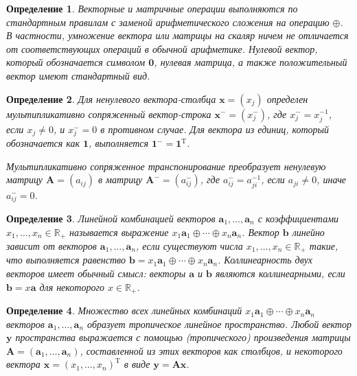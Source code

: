 \documentclass[specialist, substylefile = spbureport.rtx,
    subf,href,colorlinks=true, 12pt]{disser}
\newtheorem*{definition}{Определение}
\begin{document}
    \begin{definition}
        Векторные и матричные операции выполняются по стандартным правилам с заменой арифметического сложения на операцию $\oplus$. В частности, умножение вектора или матрицы на скаляр ничем не отличается от соответствующих операций в обычной арифметике. Нулевой вектор, который обозначается символом $\bm{0}$, нулевая матрица, а также положительный вектор имеют стандартный вид.
    \end{definition}
        
    \begin{definition}
        Для ненулевого вектора-столбца $\bm{x}=(x_{j})$ определен мультипликативно сопряженный вектор-строка $\bm{x}^{-}=(x_{j}^{-})$, где $x_{j}^{-}=x_{j}^{-1}$, если $x_{j}\ne0$, и $x_{j}^{-}=0$ в противном случае. Для вектора из единиц, который обозначается как $\bm{1}$, выполняется $\bm{1}^{-}=\bm{1}^{\mathrm{T}}$.
        
        Мультипликативно сопряженное транспонирование преобразует ненулевую матрицу $\bm{A}=(a_{ij})$ в матрицу $\bm{A}^{-}=(a_{ij}^{-})$, где $a_{ij}^{-}=a_{ji}^{-1}$, если $a_{ji}\ne0$, иначе $a_{ij}^{-}=0$.
    \end{definition}
        
    \begin{definition}
        Линейной комбинацией векторов $\bm{a}_{1},\ldots,\bm{a}_{n}$ с коэффициентами $x_{1},\ldots,x_{n}\in\mathbb{R}_{+}$ называется выражение $x_{1}\bm{a}_{1}\oplus\cdots\oplus x_{n}\bm{a}_{n}$. Вектор $\bm{b}$ линейно зависит от векторов $\bm{a}_{1},\ldots,\bm{a}_{n}$, если существуют числа $x_{1},\ldots,x_{n}\in\mathbb{R}_{+}$ такие, что выполняется равенство $\bm{b}=x_{1}\bm{a}_{1}\oplus\cdots\oplus x_{n}\bm{a}_{n}$. Коллинеарность двух векторов имеет обычный смысл: векторы $\bm{a}$ и $\bm{b}$ являются коллинеарными, если $\bm{b}=x\bm{a}$ для некоторого $x\in\mathbb{R}_{+}$.
    \end{definition}
        
    \begin{definition}
        Множество всех линейных комбинаций $x_{1}\bm{a}_{1}\oplus\cdots\oplus x_{n}\bm{a}_{n}$ векторов $\bm{a}_{1},\ldots,\bm{a}_{n}$ образует тропическое линейное пространство. Любой вектор $\bm{y}$ пространства выражается с помощью (тропического) произведения матрицы $\bm{A}=(\bm{a}_{1},\ldots,\bm{a}_{n})$, составленной из этих векторов как столбцов, и некоторого вектора $\bm{x}=(x_{1},\ldots,x_{n})^{\mathrm{T}}$ в виде $\bm{y}=\bm{A}\bm{x}$.
    \end{definition}
        
\end{document}
